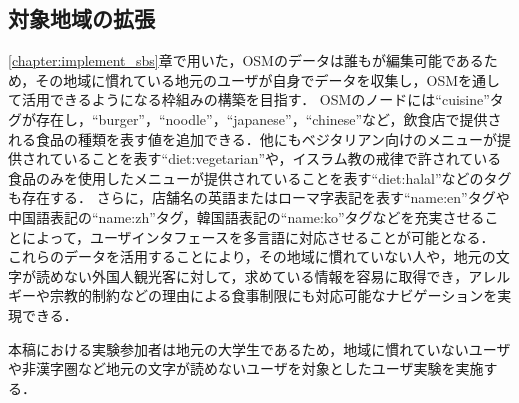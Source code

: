   \subsection{対象地域の拡張}
    \ref{chapter:implement_sbs}章で用いた，OSMのデータは誰もが編集可能であるため，その地域に慣れている地元のユーザが自身でデータを収集し，OSMを通して活用できるようになる枠組みの構築を目指す．
    OSMのノードには``cuisine''タグが存在し，``burger''，``noodle''，``japanese''，``chinese''など，飲食店で提供される食品の種類を表す値を追加できる．他にもベジタリアン向けのメニューが提供されていることを表す``diet:vegetarian''や，イスラム教の戒律で許されている食品のみを使用したメニューが提供されていることを表す``diet:halal''などのタグも存在する．
    さらに，店舗名の英語またはローマ字表記を表す``name:en''タグや中国語表記の``name:zh''タグ，韓国語表記の``name:ko''タグなどを充実させることによって，ユーザインタフェースを多言語に対応させることが可能となる．
    これらのデータを活用することにより，その地域に慣れていない人や，地元の文字が読めない外国人観光客に対して，求めている情報を容易に取得でき，アレルギーや宗教的制約などの理由による食事制限にも対応可能なナビゲーションを実現できる．
    
    本稿における実験参加者は地元の大学生であるため，地域に慣れていないユーザや非漢字圏など地元の文字が読めないユーザを対象としたユーザ実験を実施する．